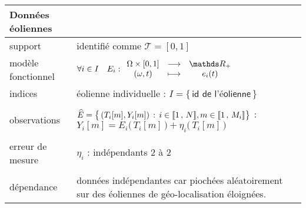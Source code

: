 \bigskip

\noalign\begin{tabularx}{\textwidth}{XX}
	\toprule
	\textbf{Données éoliennes}                                                                                                                                                                                         \\
	\midrule
	support            & identifié comme $\mathcal T = [0,1]$                                                                                                                                                          \\
	modèle fonctionnel & $\forall i \in I \quad E_i : \func {\Omega \times [0,1]} {\mathds R_+} {(\omega, t)} {e_i(t)}$                                                                                                \\
	indices            & éolienne individuelle : $I = \bigl\{ \, \textsf{id de l'éolienne} \,\bigr\}$                                                                                                                  \\
	\\
	observations       & $\widehat E = \bigl\{ \, (T_i[m], Y_i[m]) \, : \, i \in \llbracket 1 \, , \, N \rrbracket, m \in \llbracket 1 \, , \, M_i \rrbracket \bigr\}$ : $Y_i[m] = E_i\bigl( \, T_i[m] \, \bigr) + \eta_i\bigl( \, T_i[m] \, \bigr)$ \\
	\\
	erreur de mesure   & $\eta_i$ : indépendants 2 à 2                                                                                                                                                                 \\
	\\
	dépendance         & données indépendantes car piochées aléatoirement sur des éoliennes de géo-localisation éloignées.                                                                                             \\
	\bottomrule
\end{tabularx}

